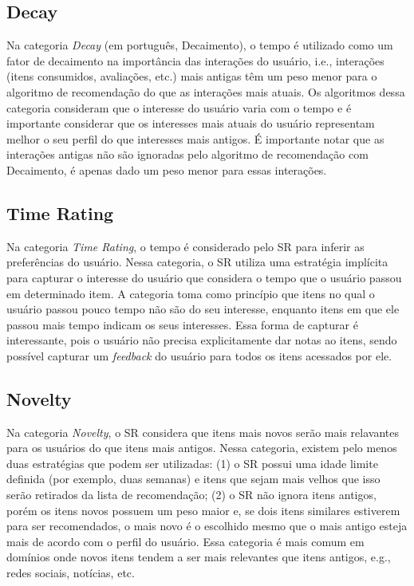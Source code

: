 \subsection{Decay}\label{section:decay}

Na categoria \textit{Decay} (em português, Decaimento), o tempo é utilizado como um fator de decaimento na importância das interações do usuário, i.e.,
interações (itens consumidos, avaliações, etc.) mais antigas têm um peso menor para o algoritmo de recomendação do que
as interações mais atuais. Os algoritmos dessa categoria consideram que o interesse do usuário varia com o tempo e é
importante considerar que os interesses mais atuais do usuário representam melhor o seu perfil do que interesses mais
antigos. É importante notar que as interações antigas não são ignoradas pelo algoritmo de recomendação com Decaimento, é
apenas dado um peso menor para essas interações.

\subsection{Time Rating}

Na categoria \textit{Time Rating}, o tempo é considerado pelo SR para inferir as preferências do usuário. Nessa categoria, o SR
utiliza uma estratégia implícita para capturar o interesse do usuário que considera o tempo que o usuário passou em
determinado item. A categoria toma como princípio que itens no qual o usuário passou pouco tempo não são do seu
interesse, enquanto itens em que ele passou mais tempo indicam os seus interesses. Essa forma de capturar é interessante,
pois o usuário não precisa explicitamente dar notas ao itens, sendo possível capturar um \textit{feedback} do usuário
para todos os itens acessados por ele.

\subsection{Novelty}

Na categoria \textit{Novelty}, o SR considera que itens mais novos serão mais relavantes para os usuários do que itens mais
antigos. Nessa categoria, existem pelo menos duas estratégias que podem ser utilizadas: (1) o SR possui uma idade limite
definida (por exemplo, duas semanas) e itens que sejam mais velhos que isso serão retirados da lista de recomendação;
(2) o SR não ignora itens antigos, porém os itens novos possuem um peso maior e, se dois itens similares estiverem para
ser recomendados, o mais novo é o escolhido mesmo que o mais antigo esteja mais de acordo com o perfil do usuário.
Essa categoria é mais comum em domínios onde novos itens tendem a ser mais relevantes que itens antigos, e.g., redes
sociais, notícias, etc.

